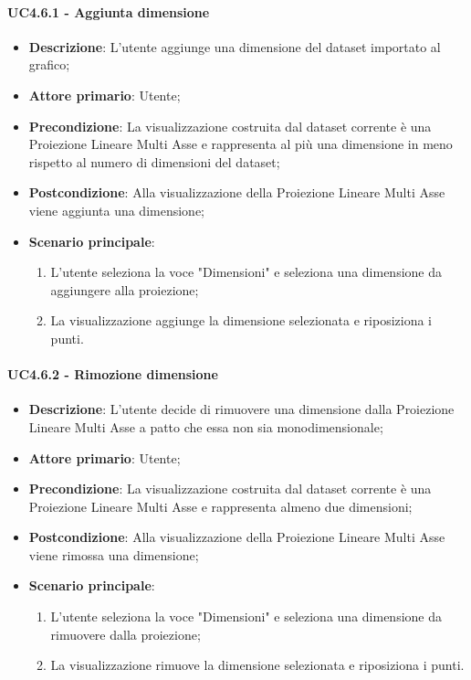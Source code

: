 \paragraph{UC4.6.1 - Aggiunta dimensione}
\label{par:uc4.6.1}
\begin{itemize}
    \item \textbf{Descrizione}: L’utente aggiunge una dimensione del dataset importato al grafico;

    \item \textbf{Attore primario}: Utente;

    \item \textbf{Precondizione}:   La visualizzazione costruita dal dataset corrente è una Proiezione Lineare Multi Asse
                                    e rappresenta al più una dimensione in meno rispetto al numero di dimensioni del dataset;
    \item \textbf{Postcondizione}:  Alla visualizzazione della Proiezione Lineare Multi Asse viene aggiunta una dimensione;

	\item \textbf{Scenario principale}:
        \begin{enumerate}
            \item L'utente seleziona la voce "Dimensioni" e seleziona una dimensione da aggiungere alla proiezione;
            \item La visualizzazione aggiunge la dimensione selezionata e riposiziona i punti.
        \end{enumerate}
\end{itemize}

\paragraph{UC4.6.2 - Rimozione dimensione}
\label{par:uc4.6.2}
\begin{itemize}
    \item \textbf{Descrizione}: L’utente decide di rimuovere una dimensione dalla Proiezione Lineare Multi Asse
                                a patto che essa non sia monodimensionale;

    \item \textbf{Attore primario}: Utente;

    \item \textbf{Precondizione}:   La visualizzazione costruita dal dataset corrente è una Proiezione Lineare Multi Asse
                                    e rappresenta almeno due dimensioni;
    \item \textbf{Postcondizione}:  Alla visualizzazione della Proiezione Lineare Multi Asse viene rimossa una dimensione;

	\item \textbf{Scenario principale}:
        \begin{enumerate}
            \item L'utente seleziona la voce "Dimensioni" e seleziona una dimensione da rimuovere dalla proiezione;
            \item La visualizzazione rimuove la dimensione selezionata e riposiziona i punti.
        \end{enumerate}
\end{itemize}

